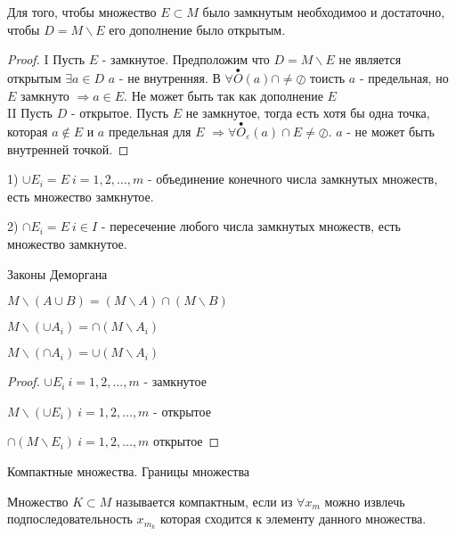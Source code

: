 \begin{theorem}
  Для того, чтобы множество $E \subset M$ было замкнутым необходимоо и
  достаточно, чтобы $D = M\backslash E$ его дополнение было открытым.
\end{theorem}

\begin{proof}
  I Пусть $E$ - замкнутое. Предположим что $D = M \backslash E$ не является
  открытым $\exists a \in D$ $a$ - не внутренняя. В $\forall
  \stackrel{\bullet}{O}(a) \cap \not= \oslash$ тоисть $a$ - предельная, но $E$
  замкнуто $\Rightarrow a \in E$. Не может быть так как дополнение $E$\\

  II Пусть $D$ - открытое. Пусть $E$ не замкнутое, тогда есть хотя бы одна
  точка, которая $a \not\in E$ и $a$ предельная для $E$ $\Rightarrow \forall
  \stackrel{\bullet}{O}_{\varepsilon}(a) \cap E \not= \oslash$. $a$ - не может
  быть внутренней точкой.
\end{proof}

\begin{block}[Свойства]
  1) $\cup E_i = E ~ i = 1,2, \ldots, m$ - объединение конечного числа
  замкнутых множеств, есть множество замкнутое.

  2) $\cap E_i = E ~ i \in I$ - пересечение любого числа замкнутых множеств,
  есть множество замкнутое.

  Законы Деморгана

  $M \backslash (A \cup B) = (M \backslash A) \cap (M \backslash B)$

  $M \backslash (\cup A_i) = \cap (M \backslash A_i)$

  $M \backslash (\cap A_i) = \cup (M \backslash A_i)$

  \begin{proof}
    $\cup E_i ~ i = 1,2, \ldots, m$ - замкнутое

    $M \backslash (\cup E_i) ~ i = 1,2, \ldots, m$ - открытое

    $\cap (M \backslash E_i) ~ i = 1,2, \ldots, m$ открытое
  \end{proof}
\end{block}

\begin{title}[\Large]
  Компактные множества. Границы множества
\end{title}

\begin{define}
  Множество $K \subset M$ называется компактным, если из $\forall x_m$ можно
  извлечь подпоследовательность $x_{m_k}$ которая сходится к элементу данного
  множества.
\end{define}

